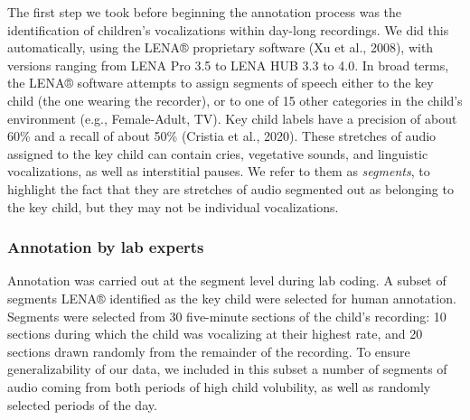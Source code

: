 \documentclass[
  english,
  ,man]{apa6}
\begin{document}
The first step we took before beginning the annotation process was the identification of children's vocalizations within day-long recordings. We did this automatically, using the LENA® proprietary software (Xu et al., 2008), with versions ranging from LENA Pro 3.5 to LENA HUB 3.3 to 4.0. In broad terms, the LENA® software attempts to assign segments of speech either to the key child (the one wearing the recorder), or to one of 15 other categories in the child's environment (e.g., Female-Adult, TV). Key child labels have a precision of about 60\% and a recall of about 50\% (Cristia et al., 2020). These stretches of audio assigned to the key child can contain cries, vegetative sounds, and linguistic vocalizations, as well as interstitial pauses. We refer to them as \emph{segments}, to highlight the fact that they are stretches of audio segmented out as belonging to the key child, but they may not be individual vocalizations.

\hypertarget{annotation-by-lab-experts}{%
\subsubsection{Annotation by lab experts}\label{annotation-by-lab-experts}}

Annotation was carried out at the segment level during lab coding. A subset of segments LENA® identified as the key child were selected for human annotation. Segments were selected from 30 five-minute sections of the child's recording: 10 sections during which the child was vocalizing at their highest rate, and 20 sections drawn randomly from the remainder of the recording. To ensure generalizability of our data, we included in this subset a number of segments of audio coming from both periods of high child volubility, as well as randomly selected periods of the day.
\end{document}
